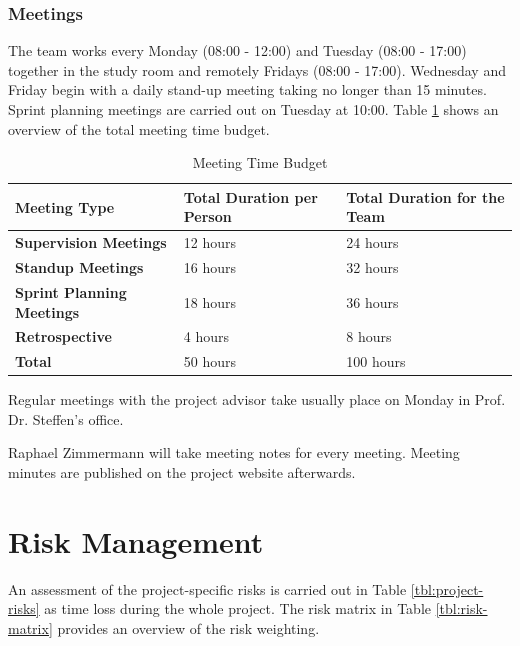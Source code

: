 \subsection{Meetings}
The team works every Monday (08:00 - 12:00) and Tuesday (08:00 - 17:00) together in the study room and remotely Fridays (08:00 - 17:00). Wednesday and Friday begin with a daily stand-up meeting taking no longer than 15 minutes. Sprint planning meetings are carried out on Tuesday at 10:00. Table \ref{meeting-time-budget} shows an overview of the total meeting time budget.

\begin{table}[]
    \centering
    \caption{Meeting Time Budget}
    \label{meeting-time-budget}
    \begin{tabular}{lll}
        \hline
        \textbf{Meeting Type}             & \textbf{Total Duration per Person} & \textbf{Total Duration for the Team} \\ \hline
        \textbf{Supervision Meetings}     & 12 hours                           & 24 hours                             \\
        \textbf{Standup Meetings}         & 16 hours                            & 32 hours                             \\
        \textbf{Sprint Planning Meetings} & 18 hours                           & 36 hours                             \\
        \textbf{Retrospective}            & 4 hours                            & 8 hours                              \\ \hline
        \textbf{Total}                    & 50 hours                           & 100 hours
    \end{tabular}
\end{table}

Regular meetings with the project advisor take usually place on Monday in Prof. Dr. Steffen's office.

Raphael Zimmermann will take meeting notes for every meeting. Meeting minutes are published on the project website afterwards.

\chapter{Risk Management}
An assessment of the project-specific risks is carried out in Table \ref{tbl:project-risks} as time loss during the whole project. The risk matrix in Table \ref{tbl:risk-matrix} provides an overview of the risk weighting.

